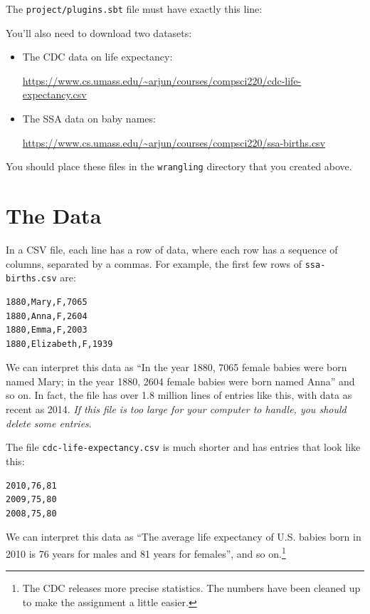 \documentclass[9pt]{extbook}
\begin{document}

The \texttt{project/plugins.sbt} file must have exactly this line:


You'll also need to download two datasets:
%
\begin{itemize}

  \item The CDC data on life expectancy:

  \url{https://www.cs.umass.edu/~arjun/courses/compsci220/cdc-life-expectancy.csv}

  \item The SSA data on baby names:

  \url{https://www.cs.umass.edu/~arjun/courses/compsci220/ssa-births.csv}

\end{itemize}

You should place these files in the \texttt{wrangling} directory that you created above.

\section{The Data}

In a CSV file, each line has a row of data, where each row
has a sequence of columns, separated by a commas. For example, the
first few rows of \texttt{ssa-births.csv} are:

\begin{verbatim}
1880,Mary,F,7065
1880,Anna,F,2604
1880,Emma,F,2003
1880,Elizabeth,F,1939
\end{verbatim}

We can interpret this data as ``In the year 1880, 7065 female babies were born
named Mary; in the year 1880, 2604 female babies were born named Anna'' and so on.
In fact, the file has over 1.8 million lines of entries like this, with data
as recent as 2014. \emph{If this file is too large for your computer to handle,
you should delete some entries}.

The file \texttt{cdc-life-expectancy.csv} is much shorter and has entries
that look like this:

\begin{verbatim}
2010,76,81
2009,75,80
2008,75,80
\end{verbatim}

We can interpret this data as ``The average life expectancy of U.S. babies born
in 2010 is 76 years for males and 81 years for females'', and so
on.\footnote{The CDC releases more precise statistics. The numbers have been
cleaned up to make the assignment a little easier.}
\end{document}

